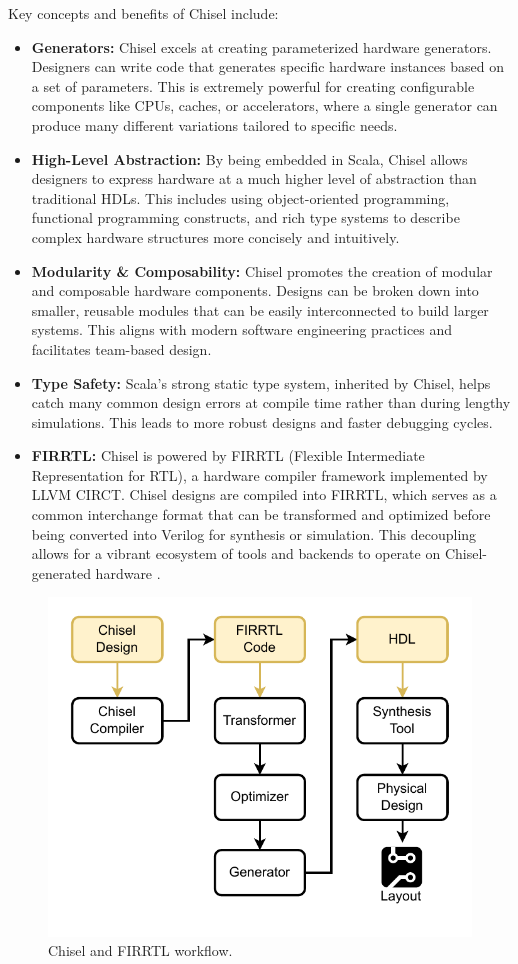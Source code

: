 Key concepts and benefits of Chisel include:
\begin{itemize}
    \item \textbf{Generators:} Chisel excels at creating parameterized hardware generators. Designers can write code that generates specific hardware instances based on a set of parameters. This is extremely powerful for creating configurable components like CPUs, caches, or accelerators, where a single generator can produce many different variations tailored to specific needs.
    \item \textbf{High-Level Abstraction:} By being embedded in Scala, Chisel allows designers to express hardware at a much higher level of abstraction than traditional HDLs. This includes using object-oriented programming, functional programming constructs, and rich type systems to describe complex hardware structures more concisely and intuitively.
    \item \textbf{Modularity \& Composability:} Chisel promotes the creation of modular and composable hardware components. Designs can be broken down into smaller, reusable modules that can be easily interconnected to build larger systems. This aligns with modern software engineering practices and facilitates team-based design.
    \item \textbf{Type Safety:} Scala's strong static type system, inherited by Chisel, helps catch many common design errors at compile time rather than during lengthy simulations. This leads to more robust designs and faster debugging cycles.
    \item \textbf{FIRRTL:} Chisel is powered by FIRRTL (Flexible Intermediate Representation for RTL), a hardware compiler framework implemented by LLVM CIRCT. Chisel designs are compiled into FIRRTL, which serves as a common interchange format that can be transformed and optimized before being converted into Verilog for synthesis or simulation. This decoupling allows for a vibrant ecosystem of tools and backends to operate on Chisel-generated hardware \cite{chipyard}.
\end{itemize}

\begin{figure}[htbp]
    \centering
    \includegraphics[width=0.75\linewidth]{Images/01_Chisel_flow.pdf}
    \caption{Chisel and FIRRTL workflow.}
    \label{fig:chisel_flow}
\end{figure}

